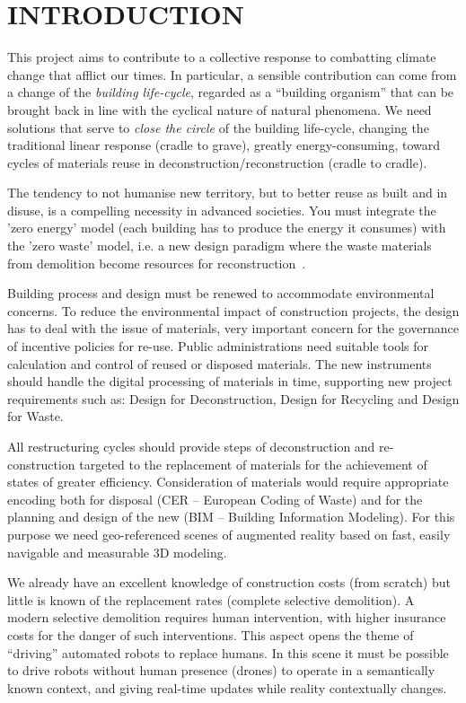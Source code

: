 \section{\uppercase{Introduction}}
\label{sec:introduction}

This project aims to contribute to a collective response to combatting climate change that afflict our times. In particular, a sensible contribution can come from a change of the \emph{building life-cycle}, regarded as a ``building organism'' that can be brought back in line with the cyclical nature of natural phenomena. We need solutions that serve to \emph{close the circle} of the building life-cycle, changing the traditional linear response (cradle to grave), greatly energy-consuming, toward cycles of materials reuse in deconstruction/reconstruction (cradle to cradle).
 
The tendency to not humanise new territory, but to better reuse as built and in disuse, is a compelling necessity in advanced societies. You must integrate the 'zero energy' model (each building has to produce the energy it consumes) with the 'zero waste' model, i.e. a new design paradigm where the waste materials from demolition become resources for reconstruction~\cite{altamura:12}. 

Building process and design must be renewed to accommodate environmental concerns. To reduce the environmental impact of construction projects, the design has to deal with the issue of materials, very  important concern for the governance of incentive policies for re-use. Public administrations need suitable tools for calculation and control of reused or disposed materials. The new instruments should handle the digital processing of materials in time, supporting new project requirements such as: Design for Deconstruction, Design for Recycling and Design for Waste.

All restructuring cycles should provide steps of deconstruction and re-construction targeted to the replacement of materials for the achievement of states of greater efficiency.
Consideration of materials would require appropriate encoding both for disposal (CER -- European Coding of Waste) and for the planning and design of the new (BIM -- Building Information Modeling). For this purpose we need geo-referenced scenes of augmented reality based on  fast, easily navigable and measurable 3D modeling. 

We already have an excellent knowledge of construction costs (from scratch) but little is known of the replacement rates (complete selective demolition). A modern selective demolition requires human intervention, with higher insurance costs for the danger of such interventions. This aspect opens the theme of ``driving'' automated robots to replace humans.  In this scene it must be possible to drive robots without human presence (drones) to  operate in a semantically known context, and giving real-time updates while reality contextually changes.

